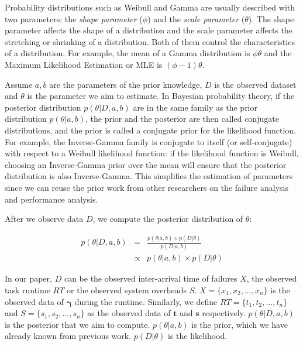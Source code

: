 \documentclass{IOS-Book-Article}
\begin{document}
Probability distributions such as Weibull and Gamma are usually described with two parameters: the \emph{shape parameter} ($\phi$) and the \emph{scale parameter} ($\theta$). The shape parameter affects the shape of a distribution and the scale parameter affects the stretching or shrinking of a distribution. Both of them control the characteristics of a distribution. For example, the mean of a Gamma distribution is $\phi\theta$ and the Maximum Likelihood Estimation or MLE is $(\phi-1)\theta$. 

Assume $a,b$ are the parameters of the prior knowledge, $D$ is the observed dataset and $\theta$ is the parameter we aim to estimate. In Bayesian probability theory, if the posterior distribution $p(\theta|D, a, b)$ are in the same family as the prior distribution $p(\theta|a, b)$, the prior and the posterior are then called conjugate distributions, and the prior is called a conjugate prior for the likelihood function. For example, the Inverse-Gamma family is conjugate to itself (or self-conjugate) with respect to a Weibull likelihood function: if the likelihood function is Weibull, choosing an Inverse-Gamma prior over the mean will ensure that the posterior distribution is also Inverse-Gamma. This simplifies the estimation of parameters since we can reuse the prior work from other researchers \cite{Schroeder2006, Iosup2008, Sun2003, Chen2011} on the failure analysis and performance analysis. 

After we observe data $D$, we compute the posterior distribution of $\theta$:

\begin{eqnarray}
	\displaystyle  
	p(\theta|D, a, b)&=&\frac{p(\theta|a, b)\times p(D|\theta)}{p(D|a, b)}\nonumber  \\
	&\propto&p(\theta|a, b)\times p(D|\theta)\nonumber 
\end{eqnarray}

In our paper, $D$ can be the observed inter-arrival time of failures $X$, the observed task runtime $RT$ or the observed system overheads $S$. 
$X=\{x_1, x_2, ..., x_n\}$ is the observed data of $\bm\gamma$ during the runtime. Similarly, we define $RT=\{t_1, t_2, ..., t_n\}$ and $S=\{s_1, s_2, ..., s_n\}$ as the observed data of $\bm t$ and $\bm s$ respectively. $p(\theta|D,a, b)$ is the posterior that we aim to compute. $p(\theta|a, b)$ is the prior, which we have already known from previous work. $p(D|\theta)$ is the likelihood. 
\end{document}
